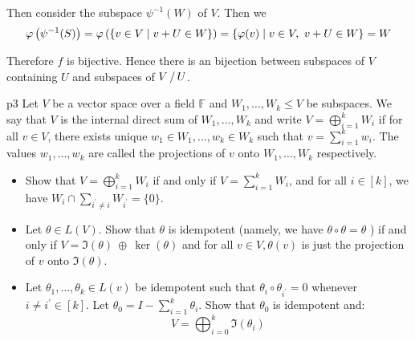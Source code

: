 \documentclass[a4paper, 11pt]{article}
\begin{document}
{\begin{enumerate}[label=(\alph*)]
\begin{itemize}
	Then consider the subspace $\psi^{-1}(W)$ of $V$. Then we  $$\varphi\left(\psi^{-1}(S)\right)=\varphi\left(\{v\in V\mid v+U\in W\}\right)=\{\varphi(v)\mid v\in V,\ v+U\in W\}=W$$
\end{itemize}
Therefore $f$ is bijective. Hence there is an bijection between subspaces of $V$ containing $U$ and subspaces of $\quotient{V}{U}$. 
\end{enumerate}
}


\begin{problem}{%
	}{p3%
	}
Let $V$ be a vector space over a field $\mathbb{F}$ and $W_1, \ldots, W_k \leq V$ be subspaces. We say that $V$ is the internal direct sum of $W_1, \ldots, W_k$ and write $V=\bigoplus\limits_{i=1}^k W_i$ if for all $v \in V$, there exists unique $w_1 \in W_1, \ldots, w_k \in W_k$ such that $v=\sum\limits_{i=1}^k w_i$. The values $w_1, \ldots, w_k$ are called the projections of $v$ onto $W_1, \ldots, W_k$ respectively.\begin{itemize}
	\item Show that $V=\bigoplus\limits_{i=1}^k W_i$ if and only if $V=\sum\limits_{i=1}^k W_i$, and for all $i \in[k]$, we have $W_i \cap \sum\limits_{i^{\prime} \neq i} W_{i^{\prime}}=\{0\}$.
	\item Let $\theta \in L(V)$. Show that $\theta$ is idempotent (namely, we have $\theta \circ \theta=\theta$ ) if and only if $V=\Im(\theta) \ \oplus \ \ker(\theta)$ and for all $v \in V, \theta(v)$ is just the projection of $v$ onto $\Im(\theta)$.
	\item Let $\theta_1, \ldots, \theta_k \in L(v)$ be idempotent such that $\theta_i \circ \theta_{i^{\prime}}=0$ whenever $i \neq i^{\prime} \in[k]$. Let $\theta_0=I-\sum\limits_{i=1}^k \theta_i$. Show that $\theta_0$ is idempotent and:
	$$
	V=\bigoplus_{i=0}^k \Im\left(\theta_i\right)
	$$
\end{itemize}

\end{problem}
\end{document}
